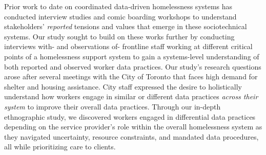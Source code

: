 Prior work to date on coordinated data-driven homelessness systems has conducted interview studies \cite{slota23, Slota_2021, karusala19, Tracey_Garcia_2024_automation, Slota_Fleischmann_Greenberg_2022, Slota_caring_2023, Slota_infra2022} and comic boarding workshops \cite{kuo23, gondimalla24} to understand stakeholders' \textit{reported} tensions and values that emerge in these sociotechnical systems. Our study sought to build on these works further by conducting interviews with- and observations of- frontline staff working at different critical points of a homelessness support system to gain a systems-level understanding \cite{kelly24, saxena2021framework2} of both reported and observed worker data practices. Our study's research questions arose after several meetings with the City of Toronto that faces high demand for shelter and housing assistance. City staff expressed the desire to holistically understand how workers engage in similar or different data practices \textit{across their system} to improve their overall data practices. Through our in-depth ethnographic study, we discovered workers engaged in differential data practices depending on the service provider’s role within the overall homelessness system as they navigated uncertainty, resource constraints, and mandated data procedures, all while prioritizing care to clients.